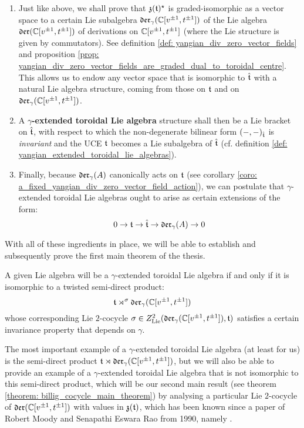         \begin{enumerate}
            \item Just like above, we shall prove that $\mathfrak{z}(\mathfrak{t})^{\star}$ is graded-isomorphic as a vector space to a certain Lie subalgebra $\mathfrak{der}_{\gamma}(\mathbb{C}[v^{\pm 1}, t^{\pm 1}])$ of the Lie algebra $\mathfrak{der}(\mathbb{C}[v^{\pm 1}, t^{\pm 1}])$ of derivations on $\mathbb{C}[v^{\pm 1}, t^{\pm 1}]$ (where the Lie structure is given by commutators). See definition \ref{def: yangian_div_zero_vector_fields} and proposition \ref{prop: yangian_div_zero_vector_fields_are_graded_dual_to_toroidal_centre}. This allows us to endow any vector space that is isomorphic to $\hat{\mathfrak{t}}$ with a natural Lie algebra structure, coming from those on $\mathfrak{t}$ and on $\mathfrak{der}_{\gamma}(\mathbb{C}[v^{\pm 1}, t^{\pm 1}])$. 
            \item A \textbf{$\gamma$-extended toroidal Lie algebra} structure shall then be a Lie bracket on $\hat{\mathfrak{t}}$, with respect to which the non-degenerate bilinear form $(-, -)_{\hat{\mathfrak{t}}}$ is \textit{invariant} and the UCE $\mathfrak{t}$ becomes a Lie subalgebra of $\hat{\mathfrak{t}}$ (cf. definition \ref{def: yangian_extended_toroidal_lie_algebras}). 
            \item Finally, because $\mathfrak{der}_{\gamma}(A)$ canonically acts on $\mathfrak{t}$ (see corollary \ref{coro: a_fixed_yangian_div_zero_vector_field_action}), we can postulate that $\gamma$-extended toroidal Lie algebras ought to arise as certain extensions of the form:
                $$0 \to \mathfrak{t} \to \hat{\mathfrak{t}} \to \mathfrak{der}_{\gamma}(A) \to 0$$
        \end{enumerate}
        
        With all of these ingredients in place, we will be able to establish and subsequently prove the first main theorem of the thesis.
        \begin{theorem}
            A given Lie algebra will be a $\gamma$-extended toroidal Lie algebra if and only if it is isomorphic to a twisted semi-direct product:
                $$\mathfrak{t} \rtimes^{\sigma} \mathfrak{der}_{\gamma}(\mathbb{C}[v^{\pm 1}, t^{\pm 1}])$$
            whose corresponding Lie $2$-cocycle $\sigma \in Z^2_{\mathrm{Lie}}(\mathfrak{der}_{\gamma}(\mathbb{C}[v^{\pm 1}, t^{\pm 1}]), \mathfrak{t})$ satisfies a certain invariance property that depends on $\gamma$.
        \end{theorem}

        The most important example of a $\gamma$-extended toroidal Lie algebra (at least for us) is the semi-direct product $\mathfrak{t} \rtimes \mathfrak{der}_{\gamma}(\mathbb{C}[v^{\pm 1}, t^{\pm 1}])$, but we will also be able to provide an example of a $\gamma$-extended toroidal Lie algebra that is not isomorphic to this semi-direct product, which will be our second main result (see theorem \ref{theorem: billig_cocycle_main_theorem}) by analysing a particular Lie $2$-cocycle of $\mathfrak{der}(\mathbb{C}[v^{\pm 1}, t^{\pm 1}])$ with values in $\mathfrak{z}(\mathfrak{t})$, which has been known since a paper of Robert Moody and Senapathi Eswara Rao from 1990, namely \cite{moody_rao_n_toroidal_vertex_representations}.

